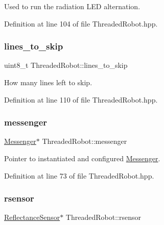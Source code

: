 Used to run the radiation L\+ED alternation. 



Definition at line 104 of file Threaded\+Robot.\+hpp.

\mbox{\label{class_threaded_robot_aacd340e703b54f0d3568c6c2bed974bf}} 
\subsubsection{\texorpdfstring{lines\+\_\+to\+\_\+skip}{lines\_to\_skip}}
{\footnotesize\ttfamily uint8\+\_\+t Threaded\+Robot\+::lines\+\_\+to\+\_\+skip\hspace{0.3cm}{\ttfamily [private]}}



How many lines left to skip. 



Definition at line 110 of file Threaded\+Robot.\+hpp.

\mbox{\label{class_threaded_robot_a7ff65f6f18c5d3a9d5823e0a00b46c9f}} 
\subsubsection{\texorpdfstring{messenger}{messenger}}
{\footnotesize\ttfamily \hyperlink{class_messenger}{Messenger}$\ast$ Threaded\+Robot\+::messenger\hspace{0.3cm}{\ttfamily [private]}}



Pointer to instantiated and configured \hyperlink{class_messenger}{Messenger}. 



Definition at line 73 of file Threaded\+Robot.\+hpp.

\mbox{\label{class_threaded_robot_a6dcf388032425561c387f153ea141c79}} 
\subsubsection{\texorpdfstring{rsensor}{rsensor}}
{\footnotesize\ttfamily \hyperlink{class_reflectance_sensor}{Reflectance\+Sensor}$\ast$ Threaded\+Robot\+::rsensor\hspace{0.3cm}{\ttfamily [private]}}



